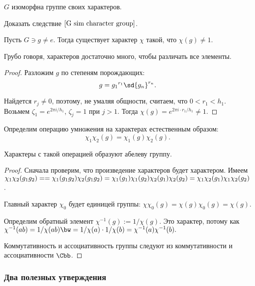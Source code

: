 \begin{imp}
  $G$ изоморфна группе своих характеров.
	\label{G sim character group}
\end{imp}

\begin{problem}
Доказать следствие $\ref{G sim character group}$.
\end{problem}

\begin{stm}
  Пусть $G \ni g \ne e$. Тогда существует характер $\chi$ такой, что 
	$\chi(g) \ne 1$.
\end{stm}

\begin{note}
Грубо говоря, характеров достаточно много, чтобы различать все элементы.
\end{note}

\begin{proof}
  Разложим $g$ по степеням порождающих: $$g = {g_1}^{r_1} \sd {g_n}^{r_n}.$$

  Найдется $r_j\ne0$, поэтому, не умаляя общности, считаем, что $0 < r_1 < h_1$. 
	Возьмем $\zeta_1 = e^{2\pi i / h_1}$, $\zeta_j = 1$ при $j > 1$. Тогда 
	$\chi(g) = e^{2\pi i \cdot r_1 / h_1} \ne 1$.
\end{proof}

Определим операцию умножения на характерах естественным образом:
$$\chi_1\chi_2(g)=\chi_1(g)\chi_2(g).$$

 Характеры с такой операцией образуют абелеву группу.
\begin{proof}
Сначала проверим, что произведение характеров будет характером. Имеем
$\chi_1 \chi_2 (g_1 g_2) =\linebreak= \chi_1 (g_1 g_2) \chi_2 (g_1 g_2) = 
\chi_1 (g_1) \chi_1 (g_2) \chi_2 (g_1) \chi_2 (g_2) = \chi_1 \chi_2 (g_1) 
\chi_1 \chi_2 (g_2)$.

Главный характер $\chi_0$ будет единицей группы: $\chi\chi_0(g)
=\chi(g)\chi_0(g)=\chi(g)$.

Определим обратный элемент $\chi^{-1}(g):=1/\chi(g)$. Это характер, потому как
$\chi^{-1}(ab)=1/\chi(ab)\bw=1/\chi(a)\cdot1/\chi(b)=\chi^{-1}(a)\chi^{-1}(b).$

Коммутативность и ассоциативность группы следуют из коммутативности и 
ассоциативности $\Cbb$.
\end{proof}

\subsubsection{Два полезных утверждения}


